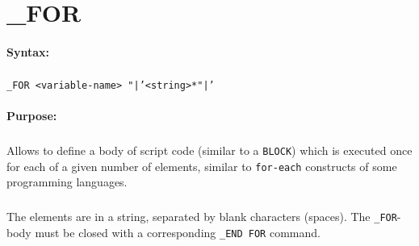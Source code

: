 
\newpage
\section{\_FOR}
\label{cmd:_FOR}

\paragraph{Syntax:}
\subparagraph{}
\texttt{\_FOR <variable-name> "|'<string>*"|'}

\paragraph{Purpose:}
\subparagraph{}
Allows to define a body of script code (similar to a \texttt{BLOCK}) which 
is executed once for each of a given number of elements, similar to 
\texttt{for-each} constructs of some programming languages.

\subparagraph{}
The elements are in a string, separated by blank characters (spaces). The 
\texttt{\_FOR}-body must be closed with a corresponding \texttt{\_END FOR} command.

